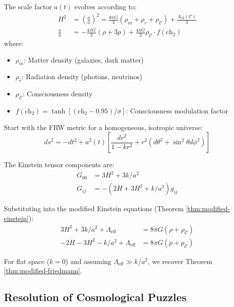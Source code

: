 \begin{thm}\label{thm:modified-friedmann-field}
The scale factor $a(t)$ evolves according to:
\begin{align}
H^2 &= \left(\frac{\dot{a}}{a}\right)^2 = \frac{8\pi G}{3}(\rho_m + \rho_r + \rho_\mathcal{C}) + \frac{\Lambda_{\text{eff}}(\mathcal{C})}{3} \\
\frac{\ddot{a}}{a} &= -\frac{4\pi G}{3}(\rho + 3p) + \frac{4\pi G}{3} \rho_\mathcal{C} \cdot f(\text{ch}_2)
\end{align}
where:
\begin{itemize}
\item $\rho_m$: Matter density (galaxies, dark matter)
\item $\rho_r$: Radiation density (photons, neutrinos)
\item $\rho_\mathcal{C}$: Consciousness density
\item $f(\text{ch}_2) = \tanh[(\text{ch}_2 - 0.95)/\sigma]$: Consciousness modulation factor
\end{itemize}
\end{thm}

\begin{level2}
Start with the FRW metric\cite{robertson1935,walker1937,friedmann1922} for a homogeneous, isotropic universe:
\begin{equation}
ds^2 = -dt^2 + a^2(t) \left[ \frac{dr^2}{1-kr^2} + r^2(d\theta^2 + \sin^2\theta d\phi^2) \right]
\end{equation}

The Einstein tensor components are:
\begin{align}
G_{00} &= 3H^2 + 3k/a^2 \\
G_{ij} &= -(2\dot{H} + 3H^2 + k/a^2) g_{ij}
\end{align}

Substituting into the modified Einstein equations (Theorem \ref{thm:modified-einstein}):
\begin{align}
3H^2 + 3k/a^2 + \Lambda_{\text{eff}} &= 8\pi G (\rho + \rho_\mathcal{C}) \\
-2\dot{H} - 3H^2 - k/a^2 + \Lambda_{\text{eff}} &= 8\pi G (p + p_\mathcal{C})
\end{align}

For flat space ($k=0$) and assuming $\Lambda_{\text{eff}} \gg k/a^2$, we recover Theorem \ref{thm:modified-friedmann}.
\end{level2}

\subsection{Resolution of Cosmological Puzzles}

